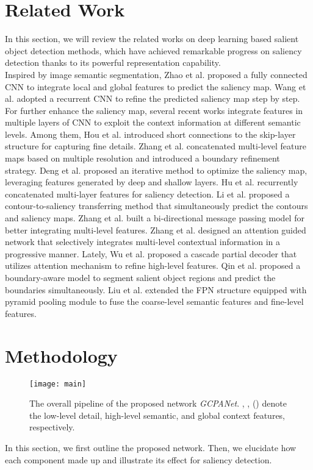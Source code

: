 \documentclass[letterpaper]{article} \usepackage{aaai20}  \usepackage{times}  \usepackage{helvet} \usepackage{courier}  \usepackage[hyphens]{url}  \usepackage{graphicx} \urlstyle{rm} \def\UrlFont{\rm}  \usepackage{graphicx}  \frenchspacing  \setlength{\pdfpagewidth}{8.5in}  \setlength{\pdfpageheight}{11in}
\begin{document}
\section{Related Work}
In this section, we will review the related works on deep learning based salient object detection methods, which have achieved remarkable progress on saliency detection thanks to its powerful representation capability. \\
\indent Inspired by image semantic segmentation, Zhao et al. \cite{zhao2015saliency}
proposed a fully connected CNN to integrate local and global features to predict the 
saliency map. Wang et al. \cite{wang2016saliency} adopted a 
recurrent CNN to refine the predicted saliency map step by step.
For further enhance the saliency map, several recent works 
\cite{hou2017deeply,zhang2017amulet,deng2018r3net,hu2018recurrently,li2018contour,zhang2018bi,zhang2018progressive}
integrate features in multiple layers of CNN to 
exploit the context information at different semantic levels.
Among them, 
Hou et al. \cite{hou2017deeply} introduced short connections to the skip-layer structure 
for capturing fine details.
Zhang et al. \cite{zhang2017amulet} concatenated multi-level feature maps based on multiple resolution 
and introduced a boundary refinement strategy.
Deng et al. \cite{deng2018r3net} proposed an iterative method to optimize the saliency map,
leveraging features generated by deep and shallow layers.
Hu et al. \cite{hu2018recurrently} recurrently concatenated multi-layer features for saliency detection.
Li et al. \cite{li2018contour} proposed a contour-to-saliency transferring method that simultaneously 
predict the contours and saliency maps.
Zhang et al. \cite{zhang2018bi} built a bi-directional message passing model 
for better integrating multi-level features.
Zhang et al. \cite{zhang2018progressive} designed an attention guided network that selectively
integrates multi-level contextual information in a progressive manner. 
Lately, Wu et al. \cite{wu2019cascaded} proposed a cascade partial decoder that utilizes attention mechanism to refine high-level features. 
Qin et al. \cite{qin2019basnet} proposed a boundary-aware model to segment salient object regions and predict the boundaries simultaneously. 
Liu et al. \cite{liu2019simple} extended the FPN  structure equipped with pyramid pooling module 
to fuse the coarse-level semantic features and fine-level features.
\section{Methodology}
\begin{figure*}[t]
	\centering
	\texttt{[image: main]}
	\caption{The overall pipeline of the proposed network \textit{GCPANet}. , ,  () denote the low-level detail, high-level semantic, and global context features, respectively.}
	\label{fig:structure}
\end{figure*}
In this section, we first outline the proposed network. Then, we elucidate how each component made up and illustrate its effect for saliency detection.
\end{document}
